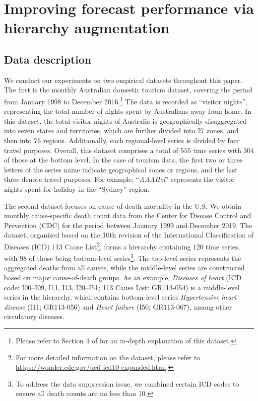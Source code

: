 \documentclass[a4paper,review,12pt,authoryear]{elsarticle}
\begin{document}
\section{Improving forecast performance via hierarchy augmentation}\label{sec:cluster}
\subsection{Data description}

We conduct our experiments on two empirical datasets throughout this paper. The first is the monthly Australian domestic tourism dataset, covering the period from January 1998 to December 2016.\footnote{Please refer to Section 4 of \cite{wickramasuriyaOptimalForecastReconciliation2019} for an in-depth explanation of this dataset.} The data is recorded as ``visitor nights'', representing the total number of nights spent by Australians away from home. In this dataset, the total visitor nights of Australia is geographically disaggregated into seven states and territories, which are further divided into $27$ zones, and then into $76$ regions. Additionally, each regional-level series is divided by four travel purposes. Overall, this dataset comprises a total of $555$ time series with $304$ of those at the bottom level. In the case of tourism data, the first two or three letters of the series name indicate geographical zones or regions, and the last three denote travel purposes. For example, ``\textit{AAAHol}'' represents the visitor nights spent for holiday in the ``Sydney'' region.


The second dataset focuses on cause-of-death mortality in the U.S. We obtain monthly cause-specific death count data from the Center for Disease Control and Prevention (CDC) for the period between January 1999 and December 2019. The dataset, organized based on the 10th revision of the International Classification of Diseases (ICD) 113 Cause List\footnote{For more detailed information on the dataset, please refer to \url{https://wonder.cdc.gov/ucd-icd10-expanded.html}.}, forms a hierarchy containing $120$ time series, with $98$ of those being bottom-level series\footnote{To address the data suppression issue, we combined certain ICD codes to ensure all death counts are no less than 10. }. The top-level series represents the aggregated deaths from all causes, while the middle-level series are constructed based on major cause-of-death groups. As an example, \textit{Diseases of heart} (ICD code: I00--I09, I11, I13, I20--I51; 113 Cause List: GR113-054) is a middle-level series in the hierarchy, which contains bottom-level series \textit{Hypertensive heart disease} (I11; GR113-056) and \textit{Heart failure} (I50; GR113-067), among other circulatory diseases.  %
\end{document}
